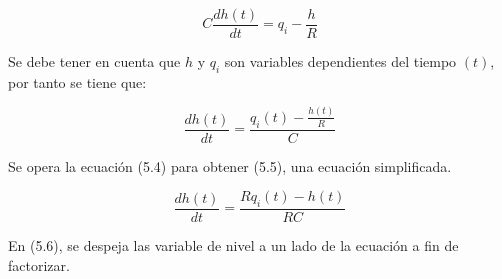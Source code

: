 \documentclass[a4paper,12pt,twoside]{proyectotanquesecci}
\begin{document}
\begin{equation}
C\frac {dh\left( t\right) }{dt}=q_{i}-\frac {h}{R}
\end{equation}

Se debe tener en cuenta que $h$ y $q_{i}$ son variables dependientes del tiempo $(t)$, por tanto se tiene que:

\begin{equation}
\frac {dh\left( t\right) }{dt}=\frac {q_{i}(t)-\frac {h(t)}{R}}{C}
\end{equation}

Se opera la ecuación (5.4) para obtener (5.5), una ecuación simplificada.

\begin{equation}
\frac {dh\left( t\right) }{dt}=\frac {Rq_{i}(t)-h(t)}{RC}
\end{equation}










En (5.6), se despeja las variable de nivel a un lado de la ecuación a fin de factorizar.
\end{document}
